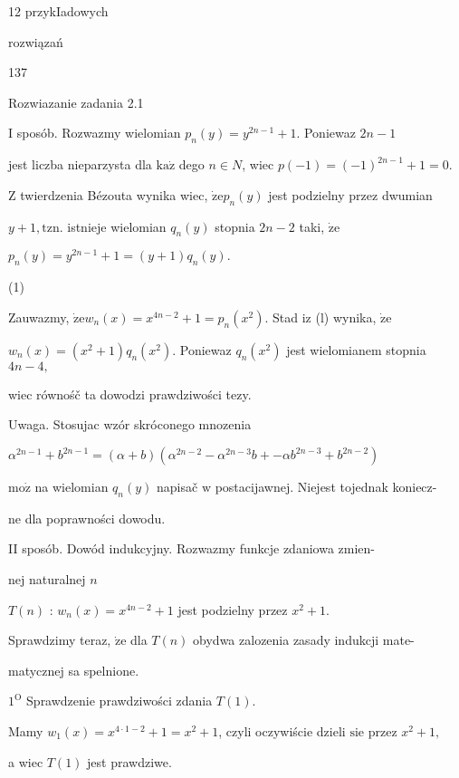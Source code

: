 \documentclass[a4paper,12pt]{article}
\begin{document}
12  przykIadowych

rozwiązań





137

Rozwiazanie zadania 2.1

I sposób. Rozwazmy wielomian $p_{n}(y) =y^{2n-1}+1$. Poniewaz $2n-1$

jest liczba nieparzysta dla $\mathrm{k}\mathrm{a}\dot{\mathrm{z}}$ dego $n\in N$, wiec $p(-1)=(-1)^{2n-1}+1=0.$

$\mathrm{Z}$ twierdzenia Bézouta wynika wiec, $\dot{\mathrm{z}}\mathrm{e}p_{n}(y)$ jest podzielny przez dwumian

$y+1, \mathrm{t}\mathrm{z}\mathrm{n}$. istnieje wielomian $q_{n}(y)$ stopnia $2n-2$ taki, $\dot{\mathrm{z}}\mathrm{e}$

$p_{n}(y)=y^{2n-1}+1=(y+1)q_{n}(y).$

(1)

Zauwazmy, $\dot{\mathrm{z}}\mathrm{e} w_{n}(x) = x^{4n-2}+1 =p_{n}(x^{2})$. Stad $\mathrm{i} \mathrm{z}$ (l) wynika, $\dot{\mathrm{z}}\mathrm{e}$

$w_{n}(x)=(x^{2}+1)q_{n}(x^{2})$. Poniewaz $q_{n}(x^{2})$ jest wielomianem stopnia $4n-4,$

wiec równośč ta dowodzi prawdziwości tezy.

Uwaga. Stosujac wzór skróconego mnozenia

$\alpha^{2n-1}+b^{2n-1}=(\alpha+b)(\alpha^{2n-2}-\alpha^{2n-3}b+-\alpha b^{2n-3}+b^{2n-2})$

$\mathrm{m}\mathrm{o}\dot{\mathrm{z}}$ na wielomian $q_{n}(y)$ napisač $\mathrm{w}$ postacijawnej. Niejest tojednak koniecz-

ne dla poprawności dowodu.

II sposób. Dowód indukcyjny. Rozwazmy funkcje zdaniowa zmien-

nej naturalnej $n$

$T(n)$ : $w_{n}(x)=x^{4n-2}+1$ jest podzielny przez $x^{2}+1.$

Sprawdzimy teraz, $\dot{\mathrm{z}}\mathrm{e}$ dla $T(n)$ obydwa zalozenia zasady indukcji mate-

matycznej sa spelnione.

$1^{\mathrm{O}}$ Sprawdzenie prawdziwości zdania $T(1).$

Mamy $w_{1}(x)=x^{4\cdot 1-2}+1=x^{2}+1$, czyli oczywiście dzieli $\mathrm{s}\mathrm{i}\mathrm{e}$ przez $x^{2}+1,$

a wiec $T(1)$ jest prawdziwe.
\end{document}
